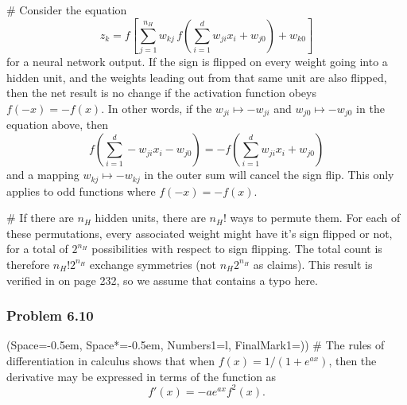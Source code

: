\documentclass[12pt, a4paper]{article}
\newcommand{\listSpace}{-0.5em}%
\begin{document}
{\begin{easylist}[enumerate]
# Consider the equation
\begin{equation*}
	z_k = f\left[
	\sum_{j=1}^{n_H} w_{kj} \, f \left( \sum_{i=1}^{d} w_{ji} x_i + w_{j0} \right) + w_{k0}
	\right]
\end{equation*}
for a neural network output.
If the sign is flipped on every weight going into a hidden unit, and the weights leading out from that same unit are also flipped, then the net result is no change if the activation function obeys $f(-x) = -f(x)$.
In other words, if the $w_{ji} \mapsto -w_{ji}$ and $w_{j0} \mapsto - w_{j0}$ in the equation above, then 
\begin{equation*}
	f \left( \sum_{i=1}^{d} -w_{ji} x_i - w_{j0} \right) = -f \left( \sum_{i=1}^{d} w_{ji} x_i + w_{j0} \right)
\end{equation*}
and a mapping $w_{kj} \mapsto -w_{kj}$ in the outer sum will cancel the sign flip.
This only applies to odd functions where $f(-x) = -f(x)$.

# If there are $n_H$ hidden units, there are $n_H!$ ways to permute them.
For each of these permutations, every associated weight might have it's sign flipped or not, for a total of $2^{n_H}$ possibilities with respect to sign flipping.
The total count is therefore $n_H! 2^{n_H}$ exchange symmetries (not $n_H 2^{n_H}$ as \cite{duda_pattern_2000} claims).
This result is verified in \cite{bishop_pattern_2011} on page 232, so we assume that \cite{duda_pattern_2000} contains a typo here.

\end{easylist}

\subsubsection*{Problem 6.10}
\begin{easylist}[enumerate]
	\ListProperties(Space=\listSpace, Space*=\listSpace, Numbers1=l, FinalMark1={)})
	# The rules of differentiation in calculus shows that when $f(x) = 1 /(1 + e^{ax} )$, then the derivative may be expressed in terms of the function as
	\begin{equation*}
		f'(x) = -a e^{ax} f^2(x).
	\end{equation*}
	

\end{easylist}}
\end{document}
